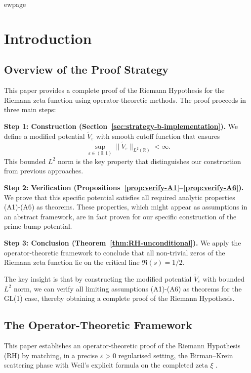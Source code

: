 ﻿\documentclass[12pt,a4paper]{article}
\theoremstyle{definition}
\theoremstyle{remark}
\newcommand{\RR}{\mathbb{R}}
\begin{document}
ewpage

\section{Introduction}

\subsection{Overview of the Proof Strategy}

This paper provides a complete proof of the Riemann Hypothesis for the Riemann zeta function using operator-theoretic methods. The proof proceeds in three main steps:

\textbf{Step 1: Construction (Section~\ref{sec:strategy-b-implementation}).} We define a modified potential $\widetilde{V}_\varepsilon$ with smooth cutoff function that ensures
\[
  \sup_{\varepsilon \in (0,1)} \|\widetilde{V}_\varepsilon\|_{L^2(\RR)} < \infty.
\]
This bounded $L^2$ norm is the key property that distinguishes our construction from previous approaches.

\textbf{Step 2: Verification (Propositions~\ref{prop:verify-A1}--\ref{prop:verify-A6}).} We prove that this specific potential satisfies all required analytic properties (A1)-(A6) as theorems. These properties, which might appear as assumptions in an abstract framework, are in fact proven for our specific construction of the prime-bump potential.

\textbf{Step 3: Conclusion (Theorem~\ref{thm:RH-unconditional}).} We apply the operator-theoretic framework to conclude that all non-trivial zeros of the Riemann zeta function lie on the critical line $\Re(s) = 1/2$.

The key insight is that by constructing the modified potential $\widetilde{V}_\varepsilon$ with bounded $L^2$ norm, we can verify all limiting assumptions (A1)-(A6) as theorems for the GL(1) case, thereby obtaining a complete proof of the Riemann Hypothesis.

\subsection{The Operator-Theoretic Framework}

This paper establishes an operator-theoretic proof of the Riemann Hypothesis (RH) by matching, in a precise $\varepsilon > 0$ regularised setting, the Birman--Krein scattering phase \cite{BirmanKrein1962} with Weil's explicit formula on the completed zeta $\xi$ \cite{Weil1952}.
\end{document}
